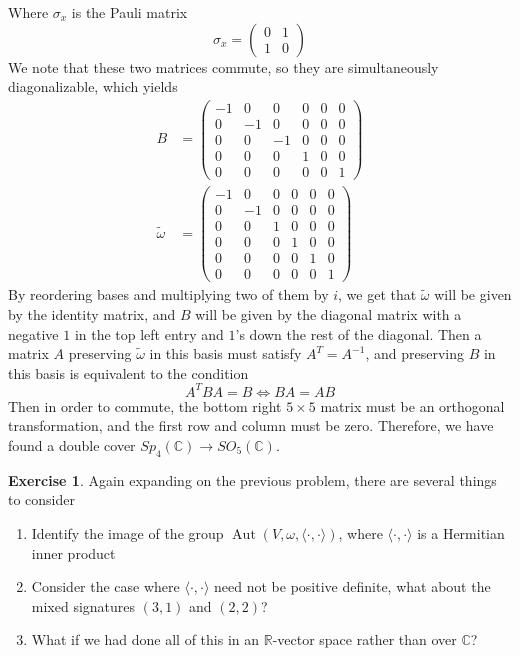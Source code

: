 \documentclass[psamsfonts]{amsart}
\theoremstyle{definition}
\newtheorem{exer}[thm]{Exercise}
\theoremstyle{remark}
\newcommand{\R}{\mathbb{R}}
\newcommand{\C}{\mathbb{C}}
\newcommand{\inv}{^{-1}}
\DeclareMathOperator{\Aut}{Aut}
\begin{document}
Where $\sigma_x$ is the Pauli matrix
$$ \sigma_x = \begin{pmatrix}
0 & 1 \\
1 & 0
\end{pmatrix} $$
We note that these two matrices commute, so they are simultaneously diagonalizable, which yields
\begin{align*}
B &= \begin{pmatrix}
-1 & 0 & 0 & 0 & 0 & 0 \\
0 & -1 & 0 & 0 & 0 & 0 \\
0 & 0 & -1 & 0 & 0 & 0 \\
0 & 0 & 0 & 1 & 0 & 0 \\
0 & 0 & 0 & 0 & 0 & 1
\end{pmatrix} \\[5pt]
\tilde{\omega} &= \begin{pmatrix}
-1 & 0 & 0 & 0 & 0 & 0 \\
0 & -1 & 0 & 0 & 0 & 0 \\
0 & 0 & 1 & 0 & 0 & 0 \\
0 & 0 & 0 & 1 & 0 & 0 \\
0 & 0 & 0 & 0 & 1 & 0 \\
0 & 0 & 0 & 0 & 0 & 1
\end{pmatrix}
\end{align*}
By reordering bases and multiplying two of them by $i$, we get that $\tilde{\omega}$ will be given by the identity matrix, and $B$ will be given by the diagonal matrix with a negative $1$ in the top left entry and $1$'s down the rest of the diagonal. Then a matrix $A$ preserving $\tilde{\omega}$ in this basis must satisfy $A^T = A\inv$, and preserving $B$ in this basis is equivalent to the condition
$$A^TBA = B \iff BA = AB $$
Then in order to commute, the bottom right $5 \times 5$ matrix must be an orthogonal transformation, and the first row and column must be zero. Therefore, we have found a double cover $Sp_4(\C) \to SO_5(\C)$.
%
\begin{exer}
Again expanding on the previous problem, there are several things to consider
\begin{enumerate}
\item Identify the image of the group $\Aut(V,\omega, \langle \cdot,\cdot \rangle)$, where $\langle \cdot, \cdot \rangle$ is a Hermitian inner product
\item Consider the case where $\langle \cdot,\cdot \rangle$ need not be positive definite, what about the mixed signatures $(3,1)$ and $(2,2)$?
\item What if we had done all of this in an $\R$-vector space rather than over $\C$?
\end{enumerate}
\end{exer}
\end{document}
